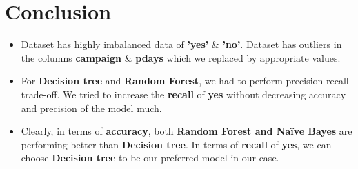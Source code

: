 \documentclass{article}
\begin{document}
\section{Conclusion}
\begin{itemize}
\item Dataset has highly imbalanced data of \textbf{'yes'} \& \textbf{'no'}. Dataset has outliers in the columns \textbf{campaign} \& \textbf{pdays} which we replaced by appropriate values. 
\item For \textbf{Decision tree} and \textbf{Random Forest}, we had to perform precision-recall trade-off. We tried to increase the \textbf{recall} of \textbf{yes} without decreasing accuracy and precision of the model much. 
\item Clearly, in terms of \textbf{accuracy}, both \textbf{Random Forest and Naïve Bayes} are performing better than \textbf{Decision tree}. In terms of \textbf{recall} of \textbf{yes}, we can choose \textbf{Decision tree} to be our preferred model in our case.
\end{itemize}
\end{document}

